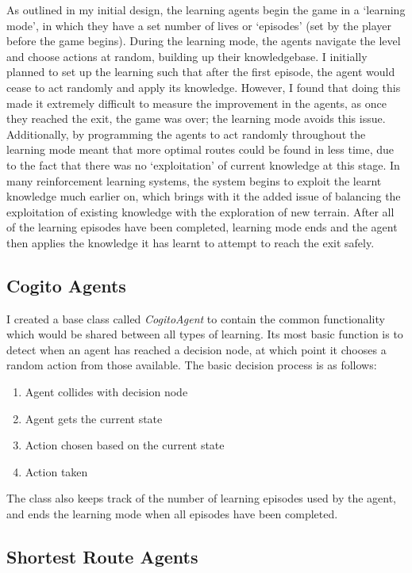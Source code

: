 \documentclass[a4paper,oneside]{report}
\begin{document}
As outlined in my initial design, the learning agents begin the game in a `learning mode', in which they have a set number of lives or `episodes' (set by the player before the game begins). During the learning mode, the agents navigate the level and choose actions at random, building up their knowledgebase. I initially planned to set up the learning such that after the first episode, the agent would cease to act randomly and apply its knowledge. However, I found that doing this made it extremely difficult to measure the improvement in the agents, as once they reached the exit, the game was over; the learning mode avoids this issue. Additionally, by programming the agents to act randomly throughout the learning mode meant that more optimal routes could be found in less time, due to the fact that there was no `exploitation' of current knowledge at this stage. In many reinforcement learning systems, the system begins to exploit the learnt knowledge much earlier on, which brings with it the added issue of balancing the exploitation of existing knowledge with the exploration of new terrain. After all of the learning episodes have been completed, learning mode ends and the agent then applies the knowledge it has learnt to attempt to reach the exit safely.

\subsection{Cogito Agents}

I created a base class called \emph{CogitoAgent} to contain the common functionality which would be shared between all types of learning. Its most basic function is to detect when an agent has reached a decision node, at which point it chooses a random action from those available. The basic decision process is as follows:

\begin{enumerate}
	\item Agent collides with decision node
	\item Agent gets the current state
	\item Action chosen based on the current state
	\item Action taken
\end{enumerate}

The class also keeps track of the number of learning episodes used by the agent, and ends the learning mode when all episodes have been completed.

\subsection{Shortest Route Agents}
\end{document}
